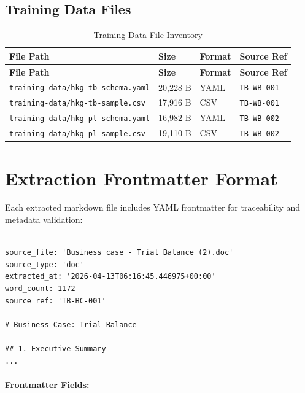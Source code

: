 \documentclass[11pt,a4paper,twoside]{report}
\newcommand{\srcref}[1]{\texttt{#1}}
\begin{document}
\subsection{Training Data Files}

\begin{longtable}{@{}L{6cm}C{2cm}C{2cm}L{3.5cm}@{}}
\caption{Training Data File Inventory}
\label{tab:training-data-inventory} \\
\toprule
\textbf{File Path} & \textbf{Size} & \textbf{Format} & \textbf{Source Ref} \\
\midrule
\endfirsthead
\toprule
\textbf{File Path} & \textbf{Size} & \textbf{Format} & \textbf{Source Ref} \\
\midrule
\endhead
\texttt{training-data/hkg-tb-schema.yaml} & 20,228 B & YAML & \srcref{TB-WB-001} \\
\texttt{training-data/hkg-tb-sample.csv} & 17,916 B & CSV & \srcref{TB-WB-001} \\
\texttt{training-data/hkg-pl-schema.yaml} & 16,982 B & YAML & \srcref{TB-WB-002} \\
\texttt{training-data/hkg-pl-sample.csv} & 19,110 B & CSV & \srcref{TB-WB-002} \\
\bottomrule
\end{longtable}

\section{Extraction Frontmatter Format}
\label{sec:extraction-frontmatter}

Each extracted markdown file includes YAML frontmatter for traceability
and metadata validation:

\begin{lstlisting}[language=yamlx,caption=Extraction Frontmatter Example]
---
source_file: 'Business case - Trial Balance (2).doc'
source_type: 'doc'
extracted_at: '2026-04-13T06:16:45.446975+00:00'
word_count: 1172
source_ref: 'TB-BC-001'
---
# Business Case: Trial Balance

## 1. Executive Summary
...
\end{lstlisting}

\paragraph{Frontmatter Fields:}
\end{document}

